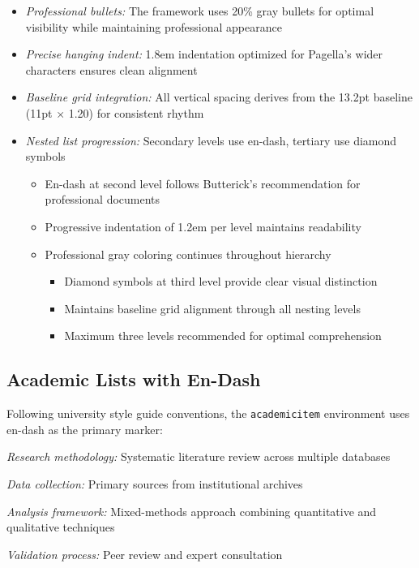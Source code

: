 \documentclass[11pt]{article}
\begin{document}
\begin{itemize}
\item \emph{Professional bullets:} The framework uses 20\% gray bullets for optimal visibility while maintaining professional appearance
\item \emph{Precise hanging indent:} 1.8em indentation optimized for Pagella's wider characters ensures clean alignment
\item \emph{Baseline grid integration:} All vertical spacing derives from the 13.2pt baseline (11pt × 1.20) for consistent rhythm
\item \emph{Nested list progression:} Secondary levels use en-dash, tertiary use diamond symbols
  \begin{itemize}
  \item En-dash at second level follows Butterick's recommendation for professional documents
  \item Progressive indentation of 1.2em per level maintains readability
  \item Professional gray coloring continues throughout hierarchy
    \begin{itemize}
    \item Diamond symbols at third level provide clear visual distinction
    \item Maintains baseline grid alignment through all nesting levels
    \item Maximum three levels recommended for optimal comprehension
    \end{itemize}
  \end{itemize}
\end{itemize}

\subsection{Academic Lists with En-Dash}

Following university style guide conventions, the \texttt{academicitem} environment uses en-dash as the primary marker:

\begin{academicitem}
\item \emph{Research methodology:} Systematic literature review across multiple databases
\item \emph{Data collection:} Primary sources from institutional archives
\item \emph{Analysis framework:} Mixed-methods approach combining quantitative and qualitative techniques
\item \emph{Validation process:} Peer review and expert consultation
\end{academicitem}
\end{document}
